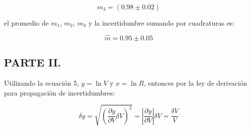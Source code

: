 \documentclass[DIV=calc, paper=a4, fontsize=11pt]{scrartcl}
\begin{document}
\begin{equation*}
    m_3 = (0.98 \pm 0.02)
\end{equation*}

el promedio de $m_1$, $m_2$, $m_3$ y la incertidumbre sumando por cuadraturas es:

\begin{equation*}
    \hat{m}= 0.95 \pm 0.05
\end{equation*}


\subsection*{\textcolor{carmine}{PARTE II.}}

Utilizando la ecuación 5, $y= \ln{V}$ y $x = \ln{R}$, entonces por la ley de derivación para propagación de incertidumbres:

\begin{equation*}
    \delta y = \sqrt{\left( \frac{\partial y}{\partial V} \delta V \right)^2} = \left|\frac{\partial y}{\partial V}\right| \delta V = \frac{\delta V}{V}
\end{equation*}
\end{document}
